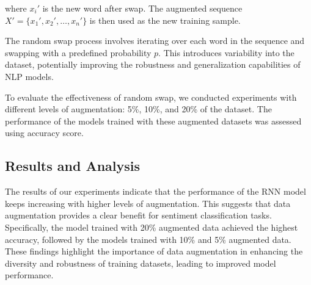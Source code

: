 \documentclass{article}
\begin{document}
where \( x_i' \) is the new word after swap. The augmented sequence \(
X' = \{x_1', x_2', \ldots, x_n'\} \) is then used as the new training sample.

The random swap process involves iterating over each word in the
sequence and swapping with a predefined probability \( p \). This introduces
variability into the dataset, potentially improving the robustness and
generalization capabilities of NLP models.

To evaluate the effectiveness of random swap, we conducted experiments
with different levels of augmentation: 5\%, 10\%, and 20\% of the dataset. The
performance of the models trained with these augmented datasets was assessed
using accuracy score.

\subsection{Results and Analysis}

The results of our experiments indicate that the performance of the RNN model
keeps increasing with higher levels of augmentation. This suggests that data
augmentation provides a clear benefit for sentiment classification tasks.
Specifically, the model trained with 20\% augmented data achieved the highest
accuracy, followed by the models trained with 10\% and 5\% augmented data.
These findings highlight the importance of data augmentation in enhancing the
diversity and robustness of training datasets, leading to improved model
performance.
\end{document}
